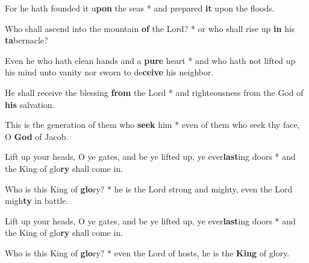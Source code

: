 \begin{multicols}{2}
	For he hath founded it u\textbf{pon} the seas * and prepared \textbf{it} upon the floods.
	
	Who shall ascend into the mountain \textbf{of} the Lord? * or who shall rise up \textbf{in} his \textbf{ta}bernacle?
	
	Even he who hath clean hands and a \textbf{pure} heart * and who hath not lifted up his mind unto vanity nor sworn to de\textbf{ceive} his neighbor.
	
	He shall receive the blessing \textbf{from} the Lord * and righteousness from the God of \textbf{his} salvation.
	
	This is the generation of them who \textbf{seek} him * even of them who seek thy face, O \textbf{God} of Jacob.
	
	Lift up your heads, O ye gates, and be ye lifted up, ye ever\textbf{last}ing doors * and the King of glo\textbf{ry} shall come in.
	
	Who is this King of \textbf{glo}ry? * he is the Lord strong and mighty, even the Lord migh\textbf{ty} in battle.
	
	Lift up your heads, O ye gates, and be ye lifted up, ye ever\textbf{last}ing doors * and the King of glo\textbf{ry} shall come in.
	
	Who is this King of \textbf{glo}ry? * even the Lord of hosts, he is the \textbf{King} of glory.
\end{multicols}